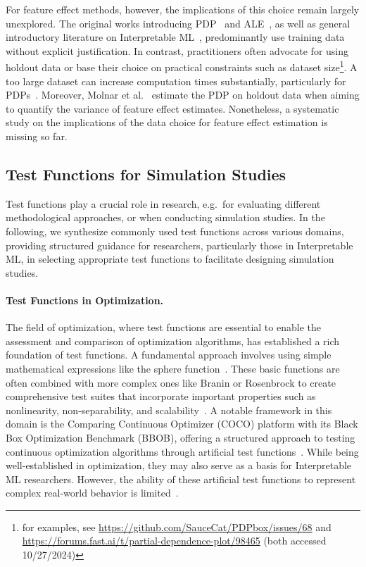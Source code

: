 \documentclass[runningheads]{llncs}
\begin{document}
For feature effect methods, however, the implications of this choice remain
largely unexplored. The original works introducing
PDP~\cite{friedman_greedy_2001} and ALE~\cite{apley_visualizing_2020}, as well
as general introductory literature on Interpretable
ML~\cite{molnar_interpretable_2022}, predominantly use training data without
explicit justification. In contrast, practitioners often advocate for using
holdout data or base their choice on practical constraints such as dataset
size\footnote{for examples, see
    \url{https://github.com/SauceCat/PDPbox/issues/68} and
    \url{https://forums.fast.ai/t/partial-dependence-plot/98465} (both accessed
    10/27/2024)}. A too large dataset can increase computation times substantially,
particularly for PDPs~\cite{friedman_greedy_2001}. Moreover, Molnar et
al.~\cite{molnar_relating_2023} estimate the PDP on holdout data when aiming to
quantify the variance of feature effect estimates. Nonetheless, a systematic
study on the implications of the data choice for feature effect estimation is
missing so far.

\subsection{Test Functions for Simulation Studies}\label{sec:test-functions}

Test functions play a crucial role in research, e.g.\ for evaluating different
methodological approaches, or when conducting simulation studies. In the
following, we synthesize commonly used test functions across various domains,
providing structured guidance for researchers, particularly those in
Interpretable ML, in selecting appropriate test functions to facilitate
designing simulation studies.

\paragraph{Test Functions in Optimization.}
The field of optimization, where test functions are essential to enable the
assessment and comparison of optimization algorithms, has established a rich
foundation of test functions. A fundamental approach involves using simple
mathematical expressions like the sphere function~\cite{more_testing_1981}.
These basic functions are often combined with more complex ones like Branin or
Rosenbrock to create comprehensive test suites that incorporate important
properties such as nonlinearity, non-separability, and
scalability~\cite{whitley_building_1998}. A notable framework in this domain is
the Comparing Continuous Optimizer (COCO) platform with its Black Box
Optimization Benchmark (BBOB), offering a structured approach to testing
continuous optimization algorithms through artificial test
functions~\cite{hansen_coco_2016}. While being
well-established in optimization, they may also serve as a basis for
Interpretable ML researchers. However, the ability of these artificial test
functions to represent complex real-world behavior is
limited~\cite{zaefferer_simulation-based_2017}.
\end{document}
